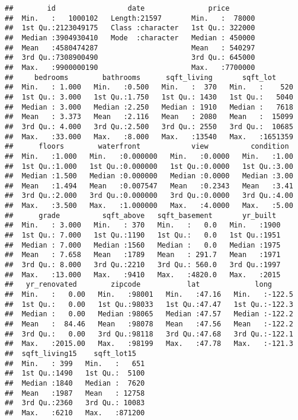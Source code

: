 \documentclass[]{article}
\begin{document}
\begin{verbatim}
##        id                 date               price        
##  Min.   :   1000102   Length:21597       Min.   :  78000  
##  1st Qu.:2123049175   Class :character   1st Qu.: 322000  
##  Median :3904930410   Mode  :character   Median : 450000  
##  Mean   :4580474287                      Mean   : 540297  
##  3rd Qu.:7308900490                      3rd Qu.: 645000  
##  Max.   :9900000190                      Max.   :7700000  
##     bedrooms        bathrooms      sqft_living       sqft_lot      
##  Min.   : 1.000   Min.   :0.500   Min.   :  370   Min.   :    520  
##  1st Qu.: 3.000   1st Qu.:1.750   1st Qu.: 1430   1st Qu.:   5040  
##  Median : 3.000   Median :2.250   Median : 1910   Median :   7618  
##  Mean   : 3.373   Mean   :2.116   Mean   : 2080   Mean   :  15099  
##  3rd Qu.: 4.000   3rd Qu.:2.500   3rd Qu.: 2550   3rd Qu.:  10685  
##  Max.   :33.000   Max.   :8.000   Max.   :13540   Max.   :1651359  
##      floors        waterfront            view          condition   
##  Min.   :1.000   Min.   :0.000000   Min.   :0.0000   Min.   :1.00  
##  1st Qu.:1.000   1st Qu.:0.000000   1st Qu.:0.0000   1st Qu.:3.00  
##  Median :1.500   Median :0.000000   Median :0.0000   Median :3.00  
##  Mean   :1.494   Mean   :0.007547   Mean   :0.2343   Mean   :3.41  
##  3rd Qu.:2.000   3rd Qu.:0.000000   3rd Qu.:0.0000   3rd Qu.:4.00  
##  Max.   :3.500   Max.   :1.000000   Max.   :4.0000   Max.   :5.00  
##      grade          sqft_above   sqft_basement       yr_built   
##  Min.   : 3.000   Min.   : 370   Min.   :   0.0   Min.   :1900  
##  1st Qu.: 7.000   1st Qu.:1190   1st Qu.:   0.0   1st Qu.:1951  
##  Median : 7.000   Median :1560   Median :   0.0   Median :1975  
##  Mean   : 7.658   Mean   :1789   Mean   : 291.7   Mean   :1971  
##  3rd Qu.: 8.000   3rd Qu.:2210   3rd Qu.: 560.0   3rd Qu.:1997  
##  Max.   :13.000   Max.   :9410   Max.   :4820.0   Max.   :2015  
##   yr_renovated        zipcode           lat             long       
##  Min.   :   0.00   Min.   :98001   Min.   :47.16   Min.   :-122.5  
##  1st Qu.:   0.00   1st Qu.:98033   1st Qu.:47.47   1st Qu.:-122.3  
##  Median :   0.00   Median :98065   Median :47.57   Median :-122.2  
##  Mean   :  84.46   Mean   :98078   Mean   :47.56   Mean   :-122.2  
##  3rd Qu.:   0.00   3rd Qu.:98118   3rd Qu.:47.68   3rd Qu.:-122.1  
##  Max.   :2015.00   Max.   :98199   Max.   :47.78   Max.   :-121.3  
##  sqft_living15    sqft_lot15    
##  Min.   : 399   Min.   :   651  
##  1st Qu.:1490   1st Qu.:  5100  
##  Median :1840   Median :  7620  
##  Mean   :1987   Mean   : 12758  
##  3rd Qu.:2360   3rd Qu.: 10083  
##  Max.   :6210   Max.   :871200
\end{verbatim}
\end{document}
